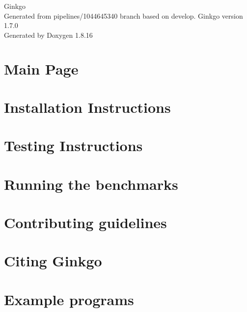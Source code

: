 \let\mypdfximage\pdfximage\def\pdfximage{\immediate\mypdfximage}\documentclass[twoside]{book}
\newcommand{\+}{\discretionary{\mbox{\scriptsize$\hookleftarrow$}}{}{}}
\newcommand{\clearemptydoublepage}{%
  \newpage{\pagestyle{empty}\cleardoublepage}%
}
\begin{document}
\hypersetup{pageanchor=false,
             bookmarksnumbered=true,
             pdfencoding=unicode
            }
\begin{titlepage}
\vspace*{7cm}
\begin{center}%
{\Large Ginkgo \\[1ex]\large Generated from pipelines/1044645340 branch based on develop. Ginkgo version 1.\+7.\+0 }\\
\vspace*{1cm}
{\large Generated by Doxygen 1.8.16}\\
\end{center}
\end{titlepage}
\clearemptydoublepage
{}
\tableofcontents
\clearemptydoublepage
{}
\hypersetup{pageanchor=true}

\chapter{Main Page}
\label{index}\hypertarget{index}{}
\chapter{Installation Instructions}
\label{install_ginkgo}

\chapter{Testing Instructions}
\label{testing_ginkgo}

\chapter{Running the benchmarks}
\label{benchmarking_ginkgo}

\chapter{Contributing guidelines}
\label{contributing_guidelines}

\chapter{Citing Ginkgo}
\label{citing_ginkgo}

\chapter{Example programs}
\label{Examples}

\end{document}
